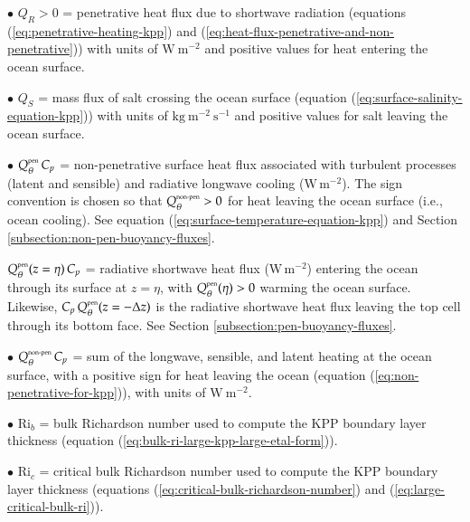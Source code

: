 \begin{mdframed}[backgroundcolor=lightgray!50]
\begin{trivlist}
\item[$\bullet$] $Q_{R} > 0$ = penetrative heat flux due to shortwave
  radiation (equations (\ref{eq:penetrative-heating-kpp}) and
  (\ref{eq:heat-flux-penetrative-and-non-penetrative})) with units of
  $\mbox{W}~\mbox{m}^{-2}$ and positive values for heat entering the
  ocean surface.

\item[$\bullet$] $Q_{S}$ = mass flux of salt crossing the ocean
  surface (equation (\ref{eq:surface-salinity-equation-kpp})) with
  units of $\mbox{kg}~\mbox{m}^{-2}~\mbox{s}^{-1}$ and positive values
  for salt leaving the ocean surface.

\item[$\bullet$] $Q_{\theta}^{\mbox{\tiny pen}} \, C_{p}$ =
  non-penetrative surface heat flux associated with turbulent
  processes (latent and sensible) and radiative longwave cooling
  ($\mbox{W} \, \mbox{m}^{-2}$).  The sign convention is chosen so
  that $Q_{\theta}^{\mbox{\tiny non-pen}} > 0$ for heat leaving the
  ocean surface (i.e., ocean cooling).  See equation
  (\ref{eq:surface-temperature-equation-kpp}) and Section
  \ref{subsection:non-pen-buoyancy-fluxes}.

\item $Q_{\theta}^{\mbox{\tiny pen}}(z=\eta) \, C_{p}$ = radiative
  shortwave heat flux ($\mbox{W} \, \mbox{m}^{-2}$) entering the ocean
  through its surface at $z=\eta$, with $Q_{\theta}^{\mbox{\tiny
      pen}}(\eta) > 0$ warming the ocean surface.  Likewise, $C_{p} \,
  Q_{\theta}^{\mbox{\tiny pen}}(z=-\Delta z)$ is the radiative
  shortwave heat flux leaving the top cell through its bottom face.
  See Section \ref{subsection:pen-buoyancy-fluxes}.

\item[$\bullet$] $Q_{\theta}^{\mbox{\tiny non-pen}} \, C_{p}$ = sum of
  the longwave, sensible, and latent heating at the ocean surface,
  with a positive sign for heat leaving the ocean (equation
  (\ref{eq:non-penetrative-for-kpp})), with units of
  $\mbox{W}~\mbox{m}^{-2}$.

\item[$\bullet$] $\mbox{Ri}_{b}$ = bulk Richardson number used to
  compute the KPP boundary layer thickness (equation
  (\ref{eq:bulk-ri-large-kpp-large-etal-form})).

\item[$\bullet$] $\mbox{Ri}_{c}$ = critical bulk Richardson number
  used to compute the KPP boundary layer thickness (equations
  (\ref{eq:critical-bulk-richardson-number}) and
  (\ref{eq:large-critical-bulk-ri})).


\end{trivlist}
\end{mdframed}
